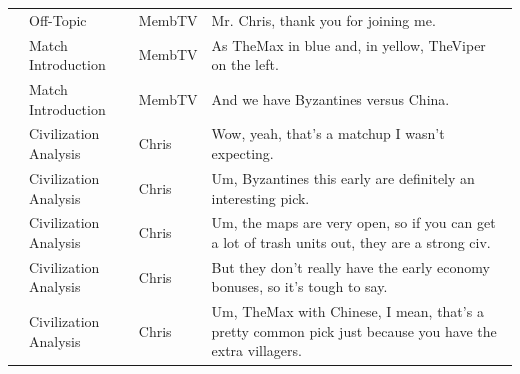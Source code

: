 {\begin{longtable}{@{}>{\theAppRow}r|L{2.3cm}L{1.0cm}U{11.55cm}@{}}
    \bottomrule
    \endlastfoot
    & Off-Topic             & MembTV       & Mr. Chris, thank you for joining me.                                                                                                                                                                                                                             \\
    & Match Introduction          & MembTV       & As TheMax in blue and, in yellow, TheViper on the left.                                                                                                                                                                                                          \\
    & Match Introduction          & MembTV       & And we have Byzantines versus China.                                                                                                                                                                                                                             \\
    & Civilization Analysis & Chris        & Wow, yeah, that's a matchup I wasn't expecting.                                                                                                                                                                                                                  \\
    & Civilization Analysis & Chris        & Um, Byzantines this early are definitely an interesting pick.                                                                                                                                                                                                    \\
    & Civilization Analysis & Chris        & Um, the maps are very open, so if you can get a lot of trash units out, they are a strong civ.                                                                                                                                                                   \\
    & Civilization Analysis & Chris        & But they don't really have the early economy bonuses, so it's tough to say.                                                                                                                                                                                      \\
    & Civilization Analysis & Chris        & Um, TheMax with Chinese, I mean, that's a pretty common pick just because you have the extra villagers.                                                                                                                                                          \\

\end{longtable}}
